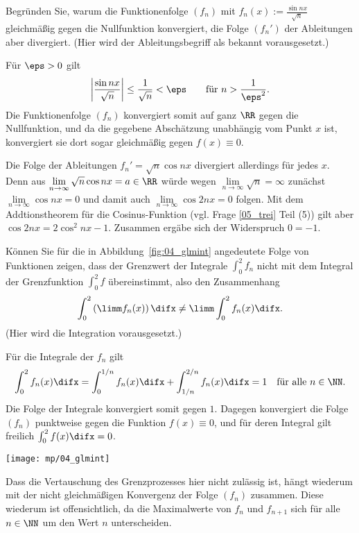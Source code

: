 \begin{frage}\label{04_glmdiff}
Begründen Sie, warum die Funktionenfolge $(f_n)$ mit 
$f_n (x) := \frac{\sin nx}{\sqrt{n}}$
gleichmäßig gegen die Nullfunktion konvergiert, 
die Folge $(f_n')$ der Ableitungen aber divergiert. 
(Hier wird der Ableitungsbegriff als bekannt vorausgesetzt.) 
\end{frage}

\begin{antwort}
Für $\eps > 0$ gilt 
\[
\left| \frac{\sin nx}{\sqrt{n}} \right| \le \frac{1}{\sqrt{n}} 
< \eps \qquad\text{für $n>\frac{1}{\eps^2}$}. 
\]
Die Funktionenfolge $(f_n)$ konvergiert somit auf ganz $\RR$ 
gegen die Nullfunktion, und da die gegebene Abschätzung 
unabhängig vom Punkt $x$ ist, konvergiert sie dort sogar gleichmäßig gegen 
$f(x)\equiv 0$.

Die Folge der Ableitungen 
$f_n' = \sqrt{n}\cos n x$ divergiert allerdings für jedes $x$. Denn aus 
$\lim\limits_{n\to\infty} \sqrt{n}\cos n x = a\in\RR$ würde wegen 
$\lim\limits_{n\to\infty} \sqrt{n} =\infty$ 
zunächst 
$\lim\limits_{n\to\infty} \cos nx =0$ und damit auch 
$\lim\limits_{n\to\infty} \cos 2n x=0$ folgen. 
Mit dem Addtionstheorem für die Cosinus-Funktion 
(vgl. Frage \ref{05_trei} Teil (5))
gilt aber $\cos 2n x= 2\cos^2 nx -1$. Zusammen ergäbe sich  
der Widerspruch $0=-1$. 
\AntEnd   
\end{antwort}

\begin{frage}\label{04_glmint}
Können Sie für die in Abbildung~\ref{fig:04_glmint} angedeutete 
Folge von Funktionen zeigen,  dass der Grenzwert der Integrale 
$\int_0^2 f_n$ nicht mit dem Integral der Grenzfunktion 
$\int_0^2 f$ übereinstimmt, also den Zusammenhang
\[
\int_0^2 \left( \limm f_n(x) \right) \difx \not= \limm \int_0^2 f_n(x)\difx.
\]
(Hier wird die Integration vorausgesetzt.)
\end{frage}  


\begin{antwort}
Für die Integrale der $f_n$ gilt 
\[
\int_0^2 f_n(x)\difx = 
\int_0^{1/n} f_n(x) \difx + \int_{1/n}^{2/n} f_n(x) \difx = 1
\quad\text{für alle $n\in \NN$}.
\]
Die Folge der Integrale konvergiert somit gegen $1$. 
Dagegen konvergiert die Folge $(f_n)$ punktweise gegen die 
Funktion $f(x)\equiv 0$, 
und für deren Integral gilt freilich $\int_0^2 f(x)\difx =0$.

\begin{center}
  \texttt{[image: mp/04\_glmint]}
  \label{fig:04_glmint}
\end{center}

Dass die Vertauschung des Grenzprozesses hier nicht zulässig ist, 
hängt wiederum mit der nicht gleichmäßigen Konvergenz der 
Folge $(f_n)$ zusammen. Diese wiederum ist offensichtlich, 
da die Maximalwerte von $f_n$ und $f_{n+1}$ 
sich für alle $n\in\NN$ um den Wert $n$ unterscheiden.   
\AntEnd 
\end{antwort}

